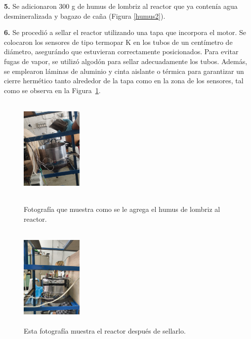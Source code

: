 \documentclass[12pt]{article}
\begin{document}
			\textbf{5.}	Se adicionaron 300 g de humus de lombriz al reactor que ya contenía agua desmineralizada y bagazo de caña (Figura \ref{humus2}).
			

			\textbf{6.} Se procedió a sellar el reactor utilizando una tapa que incorpora el motor. Se colocaron los sensores de tipo termopar K en los tubos de un centímetro de diámetro, asegurándo que estuvieran correctamente posicionados. Para evitar fugas de vapor, se utilizó algodón para sellar adecuadamente los tubos. Además, se emplearon láminas de aluminio y cinta aislante o térmica para garantizar un cierre hermético tanto alrededor de la tapa como en la zona de los sensores, tal como se observa en la Figura~\ref{cellado del reactor}.
			
		
			
	\begin{figure}[H]
		\centering
		\begin{minipage}{0.46\textwidth}
			\centering
			\includegraphics[width=3cm, height=5cm]{imagenes/humus2} %
			\caption{Fotografía que muestra como se le agrega el humus de lombriz al reactor.}
				\label{humus2}
			\end{minipage}
			\hfill
			\begin{minipage}{0.48\textwidth}
				\centering
				\includegraphics[width=3cm, height=5cm]{imagenes/cellado del reactor} %
				\caption{Esta fotografía muestra el reactor después de sellarlo.}
				\label{cellado del reactor}
			\end{minipage}
		\end{figure}
		
\end{document}
